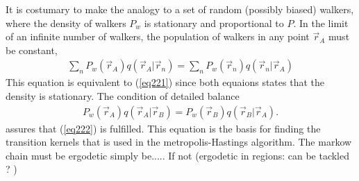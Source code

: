 \documentclass[a4paper,10pt,twocolumn]{article} %
\begin{document}
%
%
It is costumary to make the analogy to a set of random (possibly biased) walkers, where
the density of walkers $P_w$ is stationary and proportional to $P$.
In the limit of an infinite number of walkers, 
the population of walkers in any point $\vec r_A$ must be constant,
\begin{align}
	\sum_n P_w(\vec r_A) q(\vec r_A|\vec r_n)  =	\sum_n P_w(\vec r_n) q(\vec r_n|\vec r_A) \label{eq222}
\end{align} 
This equation is equivalent to (\ref{eq221}) since both equaions states that the density is stationary.
The condition of detailed balance
\begin{align}
    P_w(\vec r_A) q(\vec r_A|\vec r_B)  =  P_w(\vec r_B) q(\vec r_B|\vec r_A).\label{detbal}
\end{align}
assures that (\ref{eq222}) is fulfilled. This equation is the basis for finding the transition 
kernels that is used in the metropolis-Hastings algorithm.
The markow chain must be ergodetic simply be.....
If not (ergodetic in regions: can be tackled ? )
\end{document}
